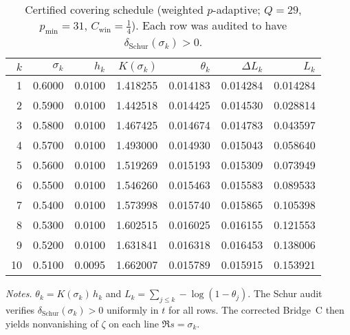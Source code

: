 
\begin{table}[H]
\centering
\caption{Certified covering schedule (weighted $p$-adaptive; $Q=29$, $p_{\min}=31$, $C_{\mathrm{win}}=\tfrac14$). Each row was audited to have $\delta_{\mathrm{Schur}}(\sigma_k)>0$.}
\label{tab:certificate-covering}
\begin{tabular}{r r r r r r r}
\toprule
$k$ & $\sigma_k$ & $h_k$ & $K(\sigma_k)$ & $\theta_k$ & $\Delta L_k$ & $L_k$ \\
\midrule
1 & 0.6000 & 0.0100 & 1.418255 & 0.014183 & 0.014284 & 0.014284 \\
2 & 0.5900 & 0.0100 & 1.442518 & 0.014425 & 0.014530 & 0.028814 \\
3 & 0.5800 & 0.0100 & 1.467425 & 0.014674 & 0.014783 & 0.043597 \\
4 & 0.5700 & 0.0100 & 1.493000 & 0.014930 & 0.015043 & 0.058640 \\
5 & 0.5600 & 0.0100 & 1.519269 & 0.015193 & 0.015309 & 0.073949 \\
6 & 0.5500 & 0.0100 & 1.546260 & 0.015463 & 0.015583 & 0.089533 \\
7 & 0.5400 & 0.0100 & 1.573998 & 0.015740 & 0.015865 & 0.105398 \\
8 & 0.5300 & 0.0100 & 1.602515 & 0.016025 & 0.016155 & 0.121553 \\
9 & 0.5200 & 0.0100 & 1.631841 & 0.016318 & 0.016453 & 0.138006 \\
10 & 0.5100 & 0.0095 & 1.662007 & 0.015789 & 0.015915 & 0.153921 \\
\bottomrule
\end{tabular}
\vspace{0.3em}

\par\small\textit{Notes.} $\theta_k=K(\sigma_k)\,h_k$ and $L_k=\sum_{j\le k}\! -\log(1-\theta_j)$. The Schur audit verifies $\delta_{\mathrm{Schur}}(\sigma_k)>0$ uniformly in $t$ for all rows. The corrected Bridge~C then yields nonvanishing of $\zeta$ on each line $\Re s=\sigma_k$.
\end{table}
